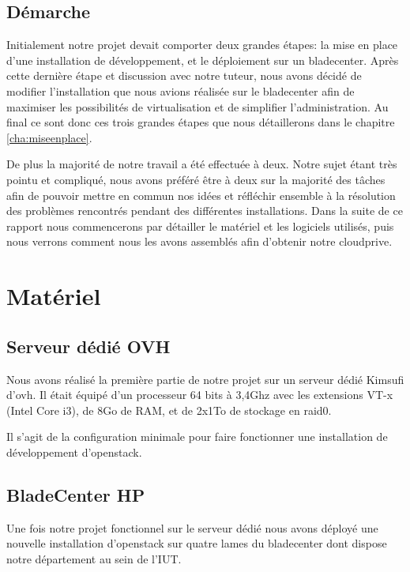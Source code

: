 \documentclass[a4paper,oneside]{report}
\begin{document}
\section{Démarche}
Initialement notre projet devait comporter deux grandes étapes: la mise en place d'une installation de développement, et le déploiement sur un \gls{bladecenter}. Après cette dernière étape et discussion avec notre tuteur, nous avons décidé de modifier l'installation que nous avions réalisée sur le \gls{bladecenter} afin de maximiser les possibilités de \gls{virtualisation} et de simplifier l'administration.\newline
Au final ce sont donc ces trois grandes étapes que nous détaillerons dans le chapitre \ref{cha:miseenplace}.

De plus la majorité de notre travail a été effectuée à deux.
Notre sujet étant très pointu et compliqué, nous avons préféré être à deux sur la majorité des tâches afin de pouvoir mettre en commun nos idées et réfléchir ensemble à la résolution des problèmes rencontrés pendant des différentes installations.
Dans la suite de ce rapport nous commencerons par détailler le matériel et les logiciels utilisés, puis nous verrons comment nous les avons assemblés afin d'obtenir notre \gls{cloudprive}.


\chapter{Matériel}

\section{Serveur dédié OVH}
Nous avons réalisé la première partie de notre projet sur un serveur dédié Kimsufi d'\gls{ovh}.
Il était équipé d'un processeur 64 bits à 3,4Ghz avec les extensions VT-x (Intel Core i3), de 8Go de RAM, et de 2x1To de stockage en \gls{raid0}.

Il s'agit de la configuration minimale pour faire fonctionner une installation de développement d'\gls{openstack}.

\section{BladeCenter HP}
Une fois notre projet fonctionnel sur le serveur dédié nous avons déployé une nouvelle installation d'\gls{openstack} sur quatre lames du \gls{bladecenter} dont dispose notre département au sein de l'IUT.
\end{document}
